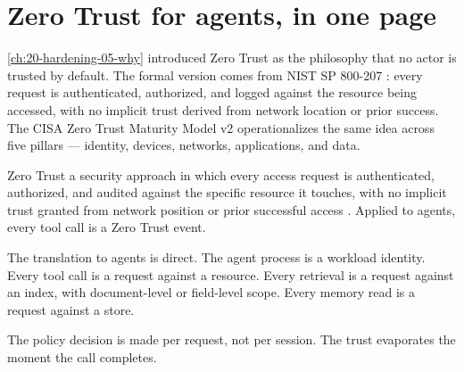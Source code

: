 \label{ch:20-hardening-07-identity}

\starttwocol

\section{Zero Trust for agents, in one page}

\autoref{ch:20-hardening-05-why} introduced Zero Trust as the philosophy that no actor is trusted by default. The formal version comes from NIST SP 800-207 \citep{nist-sp800-207}: every request is authenticated, authorized, and logged against the resource being accessed, with no implicit trust derived from network location or prior success. The CISA Zero Trust Maturity Model v2 \citep{cisa-ztmm-v2} operationalizes the same idea across five pillars --- identity, devices, networks, applications, and data.

\begin{TNdefinition}{Zero Trust}
a security approach in which every access request is authenticated, authorized, and audited against the specific resource it touches, with no implicit trust granted from network position or prior successful access \citep{nist-sp800-207}. Applied to agents, every tool call is a Zero Trust event.
\end{TNdefinition}

The translation to agents is direct. The agent process is a workload identity. Every tool call is a request against a resource. Every retrieval is a request against an index, with document-level or field-level scope. Every memory read is a request against a store.

The policy decision is made per request, not per session. The trust evaporates the moment the call completes.

